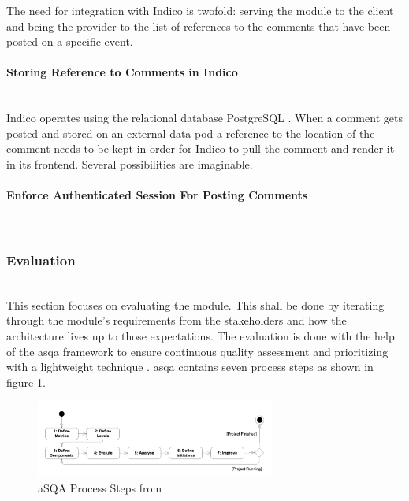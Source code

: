 The need for integration with Indico is twofold: serving the module to the client and being the provider to the list of references to the comments that have been posted on a specific event.
\vspace{0.5cm}
\paragraph{Storing Reference to Comments in Indico}\mbox{}\\
Indico operates using the relational database PostgreSQL \cite{postgresql}. When a comment gets posted and stored on an external data pod a reference to the location of the comment needs to be kept in order for Indico to pull the comment and render it in its frontend. Several possibilities are imaginable. 


\vspace{0.5cm}
\paragraph{Enforce Authenticated Session For Posting Comments}\mbox{}\\

\subsubsection{Evaluation}\mbox{}\\

This section focuses on evaluating the module. This shall be done by iterating through the module's requirements from the stakeholders and how the architecture lives up to those expectations. The evaluation is done with the help of the \gls{asqa} framework to ensure continuous quality assessment and prioritizing with a lightweight technique \cite{asqa-paper}.
\gls{asqa} contains seven process steps as shown in figure \ref{fig:asqa-process-steps}.

\begin{figure}
    \centering
    \includegraphics[width=0.7\textwidth]{thesis/latex/assets/asqa-process-steps.png}
    \caption{aSQA Process Steps from \cite{asqa-paper}}
    \label{fig:asqa-process-steps}
\end{figure}
\vspace{0.5cm}
